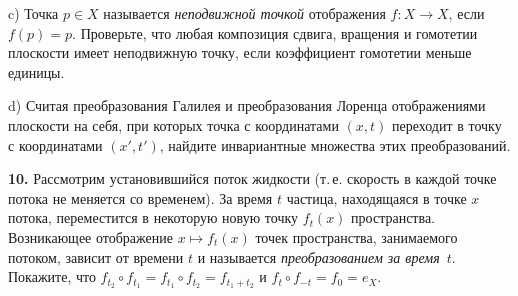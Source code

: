 c) Точка $p \in X$ называется \textit{неподвижной точкой} отображения $f \colon X \to X$, если
$f(p) = p$. Проверьте, что любая композиция сдвига, вращения и гомотетии плоскости
имеет неподвижную точку, если коэффициент гомотетии меньше единицы.

d) Считая преобразования Галилея и преобразования Лоренца отображениями
плоскости на себя, при которых точка с координатами $(x, t)$ переходит в точку с координатами $(x', t')$, найдите инвариантные множества этих преобразований.

\medskip

\textbf{10.} Рассмотрим установившийся поток жидкости (т.\,е. скорость в каждой точке
потока не меняется со временем). За время $t$ частица, находящаяся в точке $x$ потока,
переместится в некоторую новую точку $f_t(x)$ пространства. Возникающее отображение $x \mapsto f_t(x)$ точек пространства, занимаемого потоком, зависит от времени $t$
и называется \textit{преобразованием за время}~$t$. Покажите, что $f_{t_2} \circ f_{t_1} = f_{t_1} \circ f_{t_2} = f_{t_1 + t_2}$ и
$f_t \circ f_{-t} = f_0 = e_X$.
